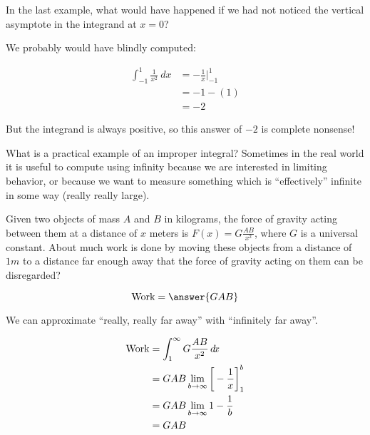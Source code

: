 \documentclass{ximera}
\begin{document}
In the last example, what would have happened if we had not noticed the vertical asymptote in the integrand at $x=0$?

We probably would have blindly computed:

\begin{align*}
\int_{-1}^1\frac1{x^2}\ dx &= -\frac1x\Big|_{-1}^1\\
			&= -1 - (1)\\
			&=-2
\end{align*}

But the integrand is always positive, so this answer of $-2$ is complete nonsense! 

What is a practical example of an improper integral?  Sometimes in the real world it is useful to compute using infinity because we are interested in limiting behavior, or because we want to measure something which is ``effectively'' infinite in some way (really really large).

\begin{example}
	Given two objects of mass $A$ and $B$ in kilograms, the force of gravity acting between them at a distance of $x$ meters is $F(x) = G\frac{AB}{x^2}$, where $G$ is a universal constant.  About much work is done by moving these objects from a distance of $1 \unit{m}$ to a distance far enough away that the force of gravity acting on them can be disregarded?
	
	\[
	\textrm{Work} = \answer{GAB}
	\]
	
	\begin{hint}
		We can approximate ``really, really far away'' with ``infinitely far away''.
	\end{hint}
	
	\begin{hint}
		\begin{align*}
			\textrm{Work} &= \int_1^\infty G\frac{AB}{x^2} \mathop{}\!d\! x\\
				&= GAB \lim_{b \to \infty} \bigg[ -\frac{1}{x} \bigg]_1^b\\
				&=GAB \lim_{b \to \infty} 1 - \frac{1}{b}\\
				&=GAB
		\end{align*}
	\end{hint}
\end{example}
\end{document}
